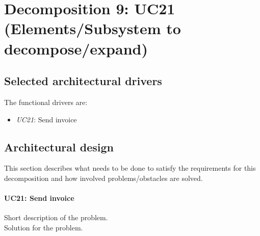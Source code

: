 \section{Decomposition 9: UC21 (Elements/Subsystem to decompose/expand)}


\subsection{Selected architectural drivers}
    The functional drivers are:
    \begin{itemize}
        \item \emph{UC21}: Send invoice \\
    \end{itemize}


\subsection{Architectural design}
    This section describes what needs to be done to satisfy the requirements for
    this decomposition and how involved problems/obstacles are solved.

    \paragraph{UC21: Send invoice}
        Short description of the problem.\\
        Solution for the problem.
        
